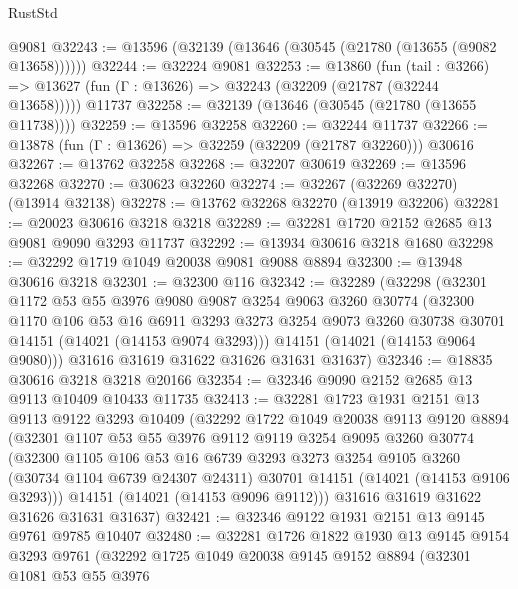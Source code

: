\begin{lexlean}{RustStd}
\begin{coremodule}
    @9081
@32243 := @13596 (@32139 (@13646 (@30545 (@21780 (@13655 (@9082 @13658))))))
@32244 := @32224 @9081
@32253 := @13860
    (fun (tail : @3266) => @13627 (fun (Γ : @13626) => @32243 (@32209 (@21787 (@32244 @13658)))))
    @11737
@32258 := @32139 (@13646 (@30545 (@21780 (@13655 @11738))))
@32259 := @13596 @32258
@32260 := @32244 @11737
@32266 := @13878 (fun (Γ : @13626) => @32259 (@32209 (@21787 @32260))) @30616
@32267 := @13762 @32258
@32268 := @32207 @30619
@32269 := @13596 @32268
@32270 := @30623 @32260
@32274 := @32267 (@32269 @32270) (@13914 @32138)
@32278 := @13762 @32268 @32270 (@13919 @32206)
@32281 := @20023 @30616 @3218 @3218
@32289 := @32281 @1720 @2152 @2685 @13 @9081 @9090 @3293 @11737
@32292 := @13934 @30616 @3218 @1680
@32298 := @32292 @1719 @1049 @20038 @9081 @9088 @8894
@32300 := @13948 @30616 @3218
@32301 := @32300 @116
@32342 := @32289
    (@32298
      (@32301
        @1172
        @53
        @55
        @3976
        @9080
        @9087
        @3254
        @9063
        @3260
        @30774
        (@32300
          @1170
          @106
          @53
          @16
          @6911
          @3293
          @3273
          @3254
          @9073
          @3260
          @30738
          @30701
          @14151
          (@14021 (@14153 @9074 @3293)))
        @14151
        (@14021 (@14153 @9064 @9080)))
      @31616
      @31619
      @31622
      @31626
      @31631
      @31637)
@32346 := @18835 @30616 @3218 @3218 @20166
@32354 := @32346 @9090 @2152 @2685 @13 @9113 @10409 @10433 @11735
@32413 := @32281
    @1723
    @1931
    @2151
    @13
    @9113
    @9122
    @3293
    @10409
    (@32292
      @1722
      @1049
      @20038
      @9113
      @9120
      @8894
      (@32301
        @1107
        @53
        @55
        @3976
        @9112
        @9119
        @3254
        @9095
        @3260
        @30774
        (@32300
          @1105
          @106
          @53
          @16
          @6739
          @3293
          @3273
          @3254
          @9105
          @3260
          (@30734 @1104 @6739 @24307 @24311)
          @30701
          @14151
          (@14021 (@14153 @9106 @3293)))
        @14151
        (@14021 (@14153 @9096 @9112)))
      @31616
      @31619
      @31622
      @31626
      @31631
      @31637)
@32421 := @32346 @9122 @1931 @2151 @13 @9145 @9761 @9785 @10407
@32480 := @32281
    @1726
    @1822
    @1930
    @13
    @9145
    @9154
    @3293
    @9761
    (@32292
      @1725
      @1049
      @20038
      @9145
      @9152
      @8894
      (@32301
        @1081
        @53
        @55
        @3976

\end{coremodule}
\end{lexlean}
